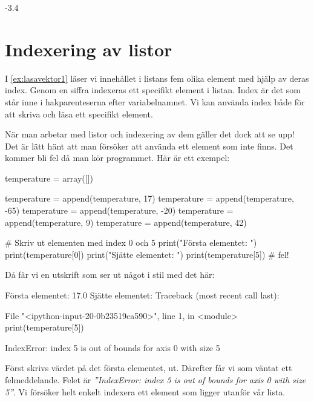 \vspace{10pt}
\begin{python}
-3.4
\end{python}

\section{Indexering av listor}

I \autoref{ex:lasavektor1} läser vi innehållet i listans fem olika element med hjälp av deras index. Genom en siffra indexeras ett specifikt element i listan. Index är det som står inne i hakparenteserna \cw{[]} efter variabelnamnet. Vi kan använda index både för att skriva och läsa ett specifikt element.

När man arbetar med listor och indexering av dem gäller det dock att se upp! Det är lätt hänt att man försöker att använda ett element som inte finns. Det kommer bli fel då man kör programmet. Här är ett exempel:

\begin{python}[caption={Felaktig indexering av en lista},label={}]
temperature = array([])

temperature = append(temperature, 17)
temperature = append(temperature, -65)
temperature = append(temperature, -20)
temperature = append(temperature, 9)
temperature = append(temperature, 42)

# Skriv ut elementen med index 0 och 5
print("Första elementet: ")
print(temperature[0])
print("Sjätte elementet: ")
print(temperature[5]) # fel!
\end{python}

Då får vi en utskrift som ser ut något i stil med det här:

\vspace{10pt}
\begin{python}
Första elementet:
17.0
Sjätte elementet:
Traceback (most recent call last):

  File "<ipython-input-20-0b23519ca590>", line 1, in <module>
    print(temperature[5])

IndexError: index 5 is out of bounds for axis 0 with size 5
\end{python}

Först skrivs värdet på det första elementet,  ut. Därefter får vi som väntat ett felmeddelande. Felet är \emph{''IndexError: index 5 is out of bounds for axis 0 with size 5''}. Vi försöker helt enkelt indexera ett element som ligger utanför vår lista.

